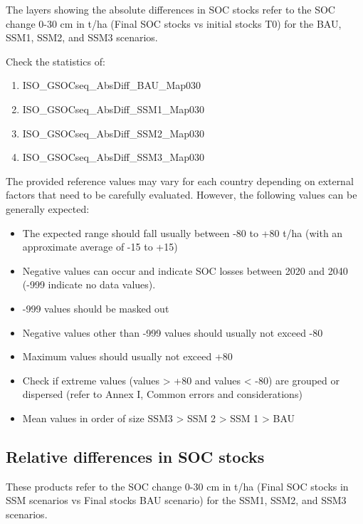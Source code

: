 \documentclass[
  10pt,
  b5paper,
]{book}
\providecommand{\tightlist}{%
  \setlength{\itemsep}{0pt}\setlength{\parskip}{0pt}}
\begin{document}
The layers showing the absolute differences in SOC stocks refer to the SOC change 0-30 cm in t/ha (Final SOC stocks vs initial stocks T0) for the BAU, SSM1, SSM2, and SSM3 scenarios.

Check the statistics of:

\begin{enumerate}
\def\labelenumi{\arabic{enumi}.}
\tightlist
\item
  ISO\_GSOCseq\_AbsDiff\_BAU\_Map030
\item
  ISO\_GSOCseq\_AbsDiff\_SSM1\_Map030
\item
  ISO\_GSOCseq\_AbsDiff\_SSM2\_Map030
\item
  ISO\_GSOCseq\_AbsDiff\_SSM3\_Map030
\end{enumerate}

The provided reference values may vary for each country depending on external factors that need to be carefully evaluated. However, the following values can be generally expected:

\begin{itemize}
\tightlist
\item
  The expected range should fall usually between -80 to +80 t/ha (with an approximate average of -15 to +15)
\item
  Negative values can occur and indicate SOC losses between 2020 and 2040 (-999 indicate no data values).
\item
  -999 values should be masked out
\item
  Negative values other than -999 values should usually not exceed -80
\item
  Maximum values should usually not exceed +80
\item
  Check if extreme values (values \textgreater{} +80 and values \textless{} -80) are grouped or dispersed (refer to Annex I, Common errors and considerations)
\item
  Mean values in order of size SSM3 \textgreater{} SSM 2 \textgreater{} SSM 1 \textgreater{} BAU
\end{itemize}

\hypertarget{relative-differences-in-soc-stocks}{%
\subsection*{Relative differences in SOC stocks}\label{relative-differences-in-soc-stocks}}

These products refer to the SOC change 0-30 cm in t/ha (Final SOC stocks in SSM scenarios vs Final stocks BAU scenario) for the SSM1, SSM2, and SSM3 scenarios.
\end{document}

